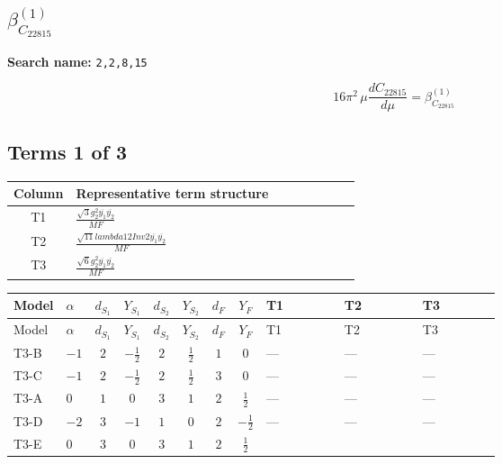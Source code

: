 \documentclass[8pt]{article}
\begin{document}
\begin{landscape}
\section*{$\beta_{C_{22815}}^{(1)}$}
\noindent\textbf{Search name: }\texttt{2,2,8,15}\par\smallskip
\[16\pi^2\,\mu\frac{d C_{22815}}{d\mu}=\beta_{C_{22815}}^{(1)}\]
\subsection*{Terms 1 of 3}
\begin{center}
\begin{tabular}{@{}c >{\raggedright\arraybackslash}p{0.82\linewidth}@{}}
\toprule
Column & Representative term structure \\
\midrule
T1 & \(\displaystyle \frac{\sqrt{3} g_{2}^{2} \overline{y_{1}} \overline{y_{2}}}{MF}\) \\
\midrule
T2 & \(\displaystyle \frac{\sqrt{11} lambda12Inv2 \overline{y_{1}} \overline{y_{2}}}{MF}\) \\
\midrule
T3 & \(\displaystyle \frac{\sqrt{6} g_{2}^{2} \overline{y_{1}} \overline{y_{2}}}{MF}\) \\
\midrule
\bottomrule
\end{tabular}
\end{center}
\smallskip
\tiny
\begin{longtable}{@{}llcccccc >{\raggedright\arraybackslash}p{0.21\linewidth} >{\raggedright\arraybackslash}p{0.21\linewidth} >{\raggedright\arraybackslash}p{0.21\linewidth}@{}}
\toprule
Model & $\alpha$ & $d_{S_1}$ & $Y_{S_1}$ & $d_{S_2}$ & $Y_{S_2}$ & $d_F$ & $Y_F$ & T1 & T2 & T3 \\
\midrule
\endfirsthead
\toprule
Model & $\alpha$ & $d_{S_1}$ & $Y_{S_1}$ & $d_{S_2}$ & $Y_{S_2}$ & $d_F$ & $Y_F$ & T1 & T2 & T3 \\
\midrule
\endhead
T3-B & $-1$ & $2$ & $-\frac{1}{2}$ & $2$ & $\frac{1}{2}$ & $1$ & $0$ & --- & --- & --- \\
\midrule
T3-C & $-1$ & $2$ & $-\frac{1}{2}$ & $2$ & $\frac{1}{2}$ & $3$ & $0$ & --- & --- & --- \\
\midrule
T3-A & $0$ & $1$ & $0$ & $3$ & $1$ & $2$ & $\frac{1}{2}$ & --- & --- & --- \\
\midrule
T3-D & $-2$ & $3$ & $-1$ & $1$ & $0$ & $2$ & $-\frac{1}{2}$ & --- & --- & --- \\
\midrule
T3-E & $0$ & $3$ & $0$ & $3$ & $1$ & $2$ & $\frac{1}{2}$ & \scriptsize\adjustbox{max width=\linewidth}{$\begin{gathered} - \frac{49 \sqrt{3} g_{2}^{2} \overline{y_{1}} \overline{y_{2}}}{24 MF}\end{gathered}$} & \scriptsize\adjustbox{max width=\linewidth}{$\begin{gathered} - \frac{3 \sqrt{11} lambda12Inv2 \overline{y_{1}} \overline{y_{2}}}{22 MF}\end{gathered}$} & \scriptsize\adjustbox{max width=\linewidth}{$\begin{gathered} - \frac{\sqrt{6} g_{2}^{2} \overline{y_{1}} \overline{y_{2}}}{3 MF}\end{gathered}$} \\

\end{longtable}
\end{landscape}
\end{document}
